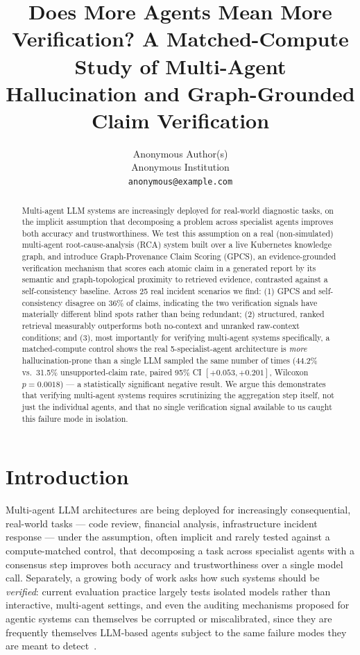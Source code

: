 \documentclass{article}
\title{Does More Agents Mean More Verification? A Matched-Compute Study of
Multi-Agent Hallucination and Graph-Grounded Claim Verification}
\author{%
  Anonymous Author(s) \\
  Anonymous Institution \\
  \texttt{anonymous@example.com} \\
}
\begin{document}
\maketitle

\begin{abstract}
Multi-agent LLM systems are increasingly deployed for real-world diagnostic
tasks, on the implicit assumption that decomposing a problem across
specialist agents improves both accuracy and trustworthiness. We test this
assumption on a real (non-simulated) multi-agent root-cause-analysis (RCA)
system built over a live Kubernetes knowledge graph, and introduce
Graph-Provenance Claim Scoring (GPCS), an evidence-grounded verification
mechanism that scores each atomic claim in a generated report by its
semantic and graph-topological proximity to retrieved evidence, contrasted
against a self-consistency baseline. Across 25 real incident scenarios we
find: (1) GPCS and self-consistency disagree on 36\% of claims, indicating
the two verification signals have materially different blind spots rather
than being redundant; (2) structured, ranked retrieval measurably
outperforms both no-context and unranked raw-context conditions; and (3),
most importantly for verifying multi-agent systems specifically, a
matched-compute control shows the real 5-specialist-agent architecture is
\emph{more} hallucination-prone than a single LLM sampled the same number
of times (44.2\% vs.\ 31.5\% unsupported-claim rate, paired 95\% CI
$[+0.053, +0.201]$, Wilcoxon $p=0.0018$) --- a statistically significant
negative result. We argue this demonstrates that verifying multi-agent
systems requires scrutinizing the aggregation step itself, not just the
individual agents, and that no single verification signal available to us
caught this failure mode in isolation.
\end{abstract}

\section{Introduction}
\label{sec:intro}

Multi-agent LLM architectures are being deployed for increasingly
consequential, real-world tasks --- code review, financial analysis,
infrastructure incident response --- under the assumption, often implicit
and rarely tested against a compute-matched control, that decomposing a
task across specialist agents with a consensus step improves both accuracy
and trustworthiness over a single model call. Separately, a growing body
of work asks how such systems should be \emph{verified}: current
evaluation practice largely tests isolated models rather than interactive,
multi-agent settings, and even the auditing mechanisms proposed for
agentic systems can themselves be corrupted or miscalibrated, since they
are frequently themselves LLM-based agents subject to the same failure
modes they are meant to detect~\citep{aigi2026,anthropic2026}.
\end{document}
